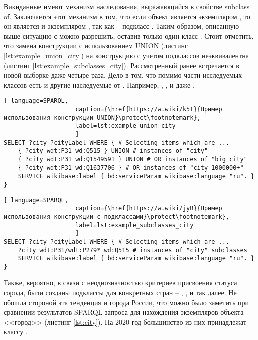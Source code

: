 Викиданные имеют механизм наследования, выражающийся в свойстве \href{https://www.wikidata.org/wiki/Property:P279}{subclass of}. Заключается этот механизм в том, что если объект является экземпляром , то он является и экземпляром  , так как  -- подкласс  . Таким образом, описанную выше ситуацию с  можно разрешить, оставив только один класс . Стоит отметить, что замена конструкции с использованием \href{https://en.wikibooks.org/wiki/SPARQL/UNION}{UNION} (листинг \ref{lst:example_union_city}) на конструкцию с учетом подклассов неэквивалентна (листинг \ref{lst:example_subclasses_city}). Рассмотренный ранее  встречается в новой выборке даже четыре раза. Дело в том, что помимо части исследуемых классов есть и другие наследуемые от . Например, , ,  и даже .

\begin{lstlisting}[ language=SPARQL, 
                    caption={\href{https://w.wiki/k5T}{Пример использования конструкции UNION}\protect\footnotemark},
                    label=lst:example_union_city
                    ]
SELECT ?city ?cityLabel WHERE { # Selecting items which are ...
	{ ?city wdt:P31 wd:Q515 } UNION # instances of "city"            
	{ ?city wdt:P31 wd:Q1549591 } UNION # OR instances of "big city"               
	{ ?city wdt:P31 wd:Q1637706 } # OR instances of "city 1000000+"
	SERVICE wikibase:label { bd:serviceParam wikibase:language "ru". }
}
\end{lstlisting}

\begin{lstlisting}[ language=SPARQL, 
                    caption={\href{https://w.wiki/jyB}{Пример использования конструкции с подклассами}\protect\footnotemark},
                    label=lst:example_subclasses_city
                    ]
SELECT ?city ?cityLabel WHERE { # Selecting items which are ...
	?city wdt:P31/wdt:P279* wd:Q515 # instances of "city" subclasses
	SERVICE wikibase:label { bd:serviceParam wikibase:language "ru". }
}
\end{lstlisting}

Также, вероятно, в связи с неоднозначностью критериев присвоения статуса города, были созданы подклассы для конкретных стран -- , ,  и так далее. Не обошла стороной эта тенденция и города России, что можно было заметить при сравнении результатов SPARQL-запроса для нахождения экземпляров объекта <<город>> (листинг \ref{lst:city}). На 2020 год большинство из них принадлежат классу .

